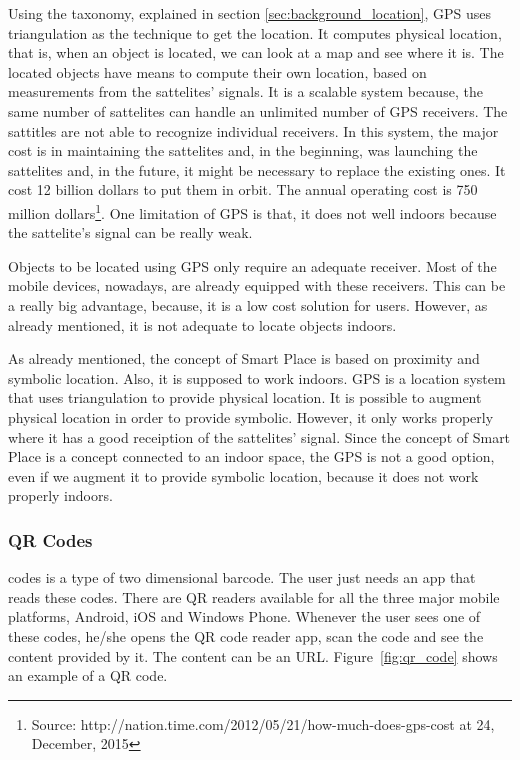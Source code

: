 Using the taxonomy, explained in section \ref{sec:background_location}, \gls{GPS} uses triangulation as the technique to get the location.
It computes physical location, that is, when an object is located, we can look at a map and see where it is.
The located objects have means to compute their own location, based on measurements from the sattelites' signals.
It is a scalable system because, the same number of sattelites can handle an unlimited number of \gls{GPS} receivers.
The sattitles are not able to recognize individual receivers.
In this system, the major cost is in maintaining the sattelites and, in the beginning, was launching the sattelites and, in the future, it might be necessary to replace the existing ones.
It cost 12 billion dollars to put them in orbit. The annual operating cost is 750 million dollars\footnote{Source: http://nation.time.com/2012/05/21/how-much-does-gps-cost at 24, December, 2015}.
One limitation of \gls{GPS} is that, it does not well indoors because the sattelite's signal can be really weak.

Objects to be located using \gls{GPS} only require an adequate receiver. Most of the mobile devices, nowadays, are already equipped with these receivers.
This can be a really big advantage, because, it is a low cost solution for users.
However, as already mentioned, it is not adequate to locate objects indoors.

As already mentioned, the concept of Smart Place is based on proximity and symbolic location.
Also, it is supposed to work indoors.
\gls{GPS} is a location system that uses triangulation to provide physical location.
It is possible to augment physical location in order to provide symbolic.
However, it only works properly where it has a good receiption of the sattelites' signal.
Since the concept of Smart Place is a concept connected to an indoor space, the \gls{GPS} is not a good option, even if we augment it to provide symbolic location, because it does not work properly indoors.

\subsubsection{QR Codes}
\label{sub:background_qr_codes}
 codes is a type of two dimensional barcode.
The user just needs an app that reads these codes.
There are \gls{QR} readers available for all the three major mobile platforms, Android, iOS and Windows Phone.
Whenever the user sees one of these codes, he/she opens the \gls{QR} code reader app, scan the code and see the content provided by it.
The content can be an \gls{URL}.
Figure~\ref{fig:qr_code} shows an example of a \gls{QR} code.

